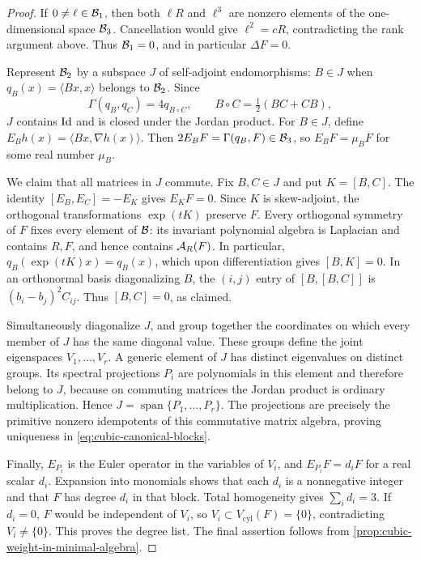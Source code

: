 \begin{proof}
If \(0\ne\ell\in\mathcal B_1\), then both \(\ell R\) and \(\ell^3\)
are nonzero elements of the one-dimensional space \(\mathcal B_3\).
Cancellation would give \(\ell^2=cR\), contradicting the rank
argument above. Thus \(\mathcal B_1=0\), and in particular \(\Delta F=0\).

Represent \(\mathcal B_2\) by a subspace \(J\) of self-adjoint
endomorphisms: \(B\in J\) when \(q_B(x)=\langle Bx,x\rangle\)
belongs to \(\mathcal B_2\). Since
\[
 \Gamma(q_B,q_C)=4q_{B\circ C},\qquad
 B\circ C=\tfrac12(BC+CB),
\]
\(J\) contains \(\operatorname{Id}\) and is closed under the Jordan product.
For \(B\in J\), define \(E_Bh(x)=\langle Bx,\nabla h(x)\rangle\).
Then \(2E_BF=\Gamma(q_B,F)\in\mathcal B_3\), so
\(E_BF=\mu_BF\) for some real number \(\mu_B\).

We claim that all matrices in \(J\) commute. Fix \(B,C\in J\)
and put \(K=[B,C]\). The identity
\([E_B,E_C]=-E_K\) gives \(E_KF=0\). Since \(K\) is
skew-adjoint, the orthogonal transformations \(\exp(tK)\) preserve
\(F\). Every orthogonal symmetry of \(F\) fixes every element of
\(\mathcal B\): its invariant polynomial algebra is Laplacian and contains
\(R,F\), and hence contains \(\mathcal A_R(F)\). In particular,
\(q_B(\exp(tK)x)=q_B(x)\), which upon differentiation gives
\([B,K]=0\). In an orthonormal basis diagonalizing \(B\),
the \((i,j)\) entry of \([B,[B,C]]\) is
\((b_i-b_j)^2C_{ij}\). Thus \([B,C]=0\), as claimed.

Simultaneously diagonalize \(J\), and group together the coordinates
on which every member of \(J\) has the same diagonal value. These
groups define the joint eigenspaces \(V_1,\ldots,V_r\).
A generic element of \(J\) has distinct eigenvalues on distinct
groups. Its spectral projections \(P_i\) are polynomials in this
element and therefore belong to \(J\), because on commuting
matrices the Jordan product is ordinary multiplication. Hence
\(J=\operatorname{span}\{P_1,\ldots,P_r\}\).
The projections are precisely the primitive nonzero idempotents of
this commutative matrix algebra, proving uniqueness in
\eqref{eq:cubic-canonical-blocks}.

Finally, \(E_{P_i}\) is the Euler operator in the variables of
\(V_i\), and \(E_{P_i}F=d_iF\) for a real scalar \(d_i\).
Expansion into monomials shows that each \(d_i\) is a nonnegative
integer and that \(F\) has degree \(d_i\) in that block.
Total homogeneity gives \(\sum_i d_i=3\). If \(d_i=0\), \(F\)
would be independent of \(V_i\), so
\(V_i\subset V_{\mathrm{cyl}}(F)=\{0\}\), contradicting
\(V_i\ne\{0\}\). This proves the degree list. The final assertion follows
from \cref{prop:cubic-weight-in-minimal-algebra}.
\end{proof}

